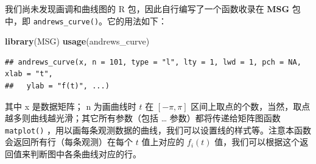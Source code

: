 \documentclass[
  b5paper,
  UTF8,twoside]{book}
\newenvironment{Shaded}{\begin{snugshade}}{\end{snugshade}}
\newcommand{\AttributeTok}[1]{\textcolor[rgb]{0.13,0.29,0.53}{#1}}
\newcommand{\DecValTok}[1]{\textcolor[rgb]{0.00,0.00,0.81}{#1}}
\newcommand{\FloatTok}[1]{\textcolor[rgb]{0.00,0.00,0.81}{#1}}
\newcommand{\FunctionTok}[1]{\textcolor[rgb]{0.13,0.29,0.53}{\textbf{#1}}}
\newcommand{\NormalTok}[1]{#1}
\newcommand{\OtherTok}[1]{\textcolor[rgb]{0.56,0.35,0.01}{#1}}
\newcommand{\SpecialCharTok}[1]{\textcolor[rgb]{0.81,0.36,0.00}{\textbf{#1}}}
\newcommand{\StringTok}[1]{\textcolor[rgb]{0.31,0.60,0.02}{#1}}
\begin{document}
我们尚未发现画调和曲线图的 R 包，因此自行编写了一个函数收录在 \textbf{MSG} 包 \citep{MSG} 中，即 \texttt{andrews\_curve()}。它的用法如下：

\begin{Shaded}
\begin{Highlighting}[]
\FunctionTok{library}\NormalTok{(MSG)}
\FunctionTok{usage}\NormalTok{(andrews\_curve)}
\end{Highlighting}
\end{Shaded}

\begin{verbatim}
## andrews_curve(x, n = 101, type = "l", lty = 1, lwd = 1, pch = NA, xlab = "t",
##   ylab = "f(t)", ...)
\end{verbatim}

其中 x 是数据矩阵； n 为画曲线时 \(t\) 在 \([-\pi,\pi]\) 区间上取点的个数，当然，取点越多则曲线越光滑；其它所有参数（包括 \ldots{} 参数）都将传递给矩阵图函数 \texttt{matplot()} ，用以画每条观测数据的曲线，我们可以设置线的样式等。注意本函数会返回所有行（每条观测）在每个 \(t\) 值上对应的 \(f_{i}(t)\) 值，我们可以根据这个返回值来判断图中各条曲线对应的行。





\begin{Shaded}
\end{Shaded}
\end{document}
